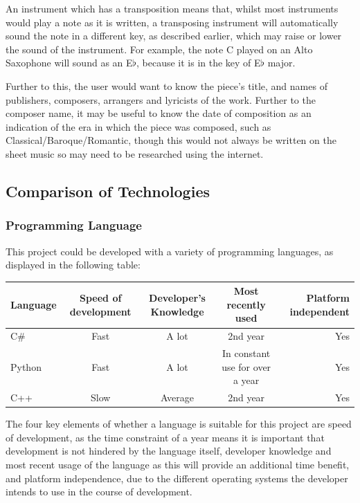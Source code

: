 An instrument which has a transposition means that, whilst most instruments would play a note as it is written, a transposing instrument will automatically sound the note in a different key, as described earlier, which may raise or lower the sound of the instrument. For example, the note C played on an Alto Saxophone will sound as an E$\flat$, because it is in the key of E$\flat$ major. 

Further to this, the user would want to know the piece's title, and names of publishers, composers, arrangers and lyricists of the work. Further to the composer name, it may be useful to know the date of composition as an indication of the era in which the piece was composed, such as Classical/Baroque/Romantic, though this would not always be written on the sheet music so may need to be researched using the internet.


\subsection{Comparison of Technologies}
\subsubsection{Programming Language}
This project could be developed with a variety of programming languages, as displayed in the following table:

\begin{center}
\begin{tabular}{| l | c | c | c | r |} \hline
  {Language} & {Speed of development} & {Developer's Knowledge} & {Most recently used} & {Platform independent} \\ \hline
  C\# & Fast & A lot & 2nd year & Yes \\ \hline
  Python & Fast & A lot & In constant use for over a year & Yes \\ \hline
  C++ & Slow & Average & 2nd year & Yes \\ \hline
\end{tabular}
\end{center}
The four key elements of whether a language is suitable for this project are speed of development, as the time constraint of a year means it is important that development is not hindered by the language itself, developer knowledge and most recent usage of the language as this will provide an additional time benefit, and platform independence, due to the different operating systems the developer intends to use in the course of development.

